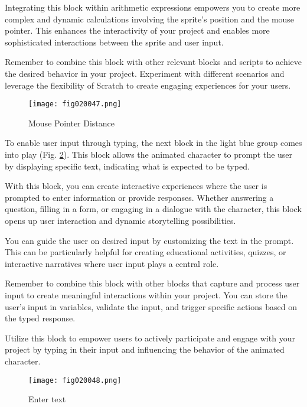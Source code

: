 Integrating this block within arithmetic expressions empowers you to create more complex and dynamic calculations involving the sprite's position and the mouse pointer. This enhances the interactivity of your project and enables more sophisticated interactions between the sprite and user input.

Remember to combine this block with other relevant blocks and scripts to achieve the desired behavior in your project. Experiment with different scenarios and leverage the flexibility of Scratch to create engaging experiences for your users.

\begin{figure}[H]
   \centering
   \texttt{[image: fig020047.png]}
   \caption{Mouse Pointer Distance}
\label{fig020047}
\end{figure}

To enable user input through typing, the next block in the light blue group comes into play (Fig. \ref{fig020048}). This block allows the animated character to prompt the user by displaying specific text, indicating what is expected to be typed.

With this block, you can create interactive experiences where the user is prompted to enter information or provide responses. Whether answering a question, filling in a form, or engaging in a dialogue with the character, this block opens up user interaction and dynamic storytelling possibilities.

You can guide the user on desired input by customizing the text in the prompt. This can be particularly helpful for creating educational activities, quizzes, or interactive narratives where user input plays a central role.

Remember to combine this block with other blocks that capture and process user input to create meaningful interactions within your project. You can store the user's input in variables, validate the input, and trigger specific actions based on the typed response.

Utilize this block to empower users to actively participate and engage with your project by typing in their input and influencing the behavior of the animated character.

\begin{figure}[H]
   \centering
   \texttt{[image: fig020048.png]}
   \caption{Enter text}
\label{fig020048}
\end{figure}

